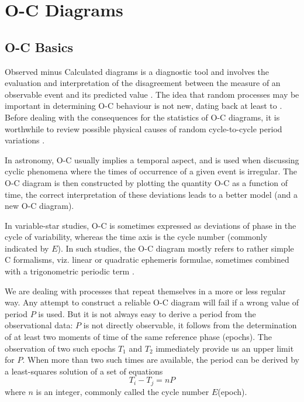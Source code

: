 \chapter{O-C Diagrams}
\label{Chapter_oc}
\section{O-C Basics}
Observed minus Calculated diagrams is a diagnostic tool and involves the evaluation and interpretation 
of the disagreement between the measure of an observable event and its
predicted value \citep{Sterken2005basic}.
The idea that random processes may be important in determining O-C behaviour is not new, dating back at least to
\cite{Eddington1929}. Before dealing with the consequences for the statistics of
O-C diagrams, it is worthwhile to review possible physical causes of random
cycle-to-cycle period variations \citep{Koen2005stat}.

In astronomy, O-C usually implies a temporal aspect, and is used when
discussing cyclic phenomena where the times of occurrence of a given event is irregular. 
The O-C diagram is then constructed by plotting the quantity O-C as a function of time, the correct interpretation 
of these deviations leads to a better model (and a new O-C diagram).

In variable-star studies, O-C is sometimes expressed as deviations of phase
in the cycle of variability, whereas the time axis is the cycle number (commonly
indicated by $E$). In such studies, the O-C diagram mostly refers to rather
simple C formalisms, viz. linear or quadratic ephemeris formulae, sometimes
combined with a trigonometric periodic term \citep{Sterken2005basic}.


We are dealing with processes that repeat themselves in a more or less regular way.
Any attempt to construct a reliable O-C diagram will fail if a wrong
value of period $P$ is used. But it is not always easy to derive a period from the observational data: 
$P$ is not directly observable, it follows from the
determination of at least two moments of time of the same reference phase (epochs). 
The observation of two such epochs $T_{1}$ and $T_{2}$ immediately provide us an upper limit for $P$. 
When more than two such times are available, the period can be derived by a least-squares solution of a set of
equations
\begin{equation} \label{eq:period}
T_{i} - T_{j} = nP
\end{equation}
where $n$ is an integer, commonly called the cycle number $E$(epoch).

